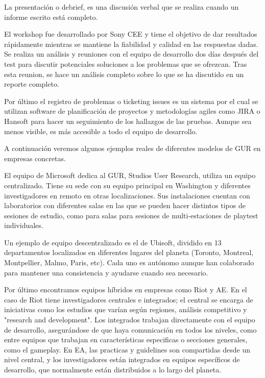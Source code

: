 La presentación o debrief, es una discusión verbal que se realiza cuando un informe escrito está completo.

El workshop fue desarrollado por Sony CEE y tiene el objetivo de dar resultados rápidamente mientras se mantiene la fiabilidad y calidad en las respuestas dadas. Se realiza un análisis y reuniones con el equipo de desarrollo dos días después del test para discutir potenciales soluciones a los problemas que se ofrezcan. Tras esta reunion, se hace un análisis completo sobre lo que se ha discutido en un reporte completo.

Por último el registro de problemas o ticketing issues es un sistema por el cual se utilizan software de planificación de proyectos y metodologías agiles como JIRA o Hansoft para hacer un seguimiento de los hallazgos de las pruebas. Aunque sea menos visible, es más accesible a todo el equipo de desarrollo.




A continuación veremos algunos ejemplos reales de diferentes modelos de GUR en empresas concretas.

El equipo de Microsoft dedica al GUR, Studios User Research, utiliza un equipo centralizado. Tiene su sede con su equipo principal en Washington y diferentes investigadores en remoto en otras localizaciones. Sus instalaciones cuentan con laboratorios con diferentes salas en las que se pueden hacer distintos tipos de sesiones de estudio, como para salas para sesiones de multi-estaciones de playtest individuales.

Un ejemplo de equipo descentralizado es el de Ubisoft, dividido en 13 departamentos localizados en diferentes lugares del planeta (Toronto, Montreal, Montpellier, Malmo, Paris, etc). Cada uno es autónomo aunque han colaborado para mantener una consistencia y ayudarse cuando sea necesario.

Por último encontramos equipos híbridos en empresas como Riot y AE. En el caso de Riot tiene investigadores centrales e integrados; el central se encarga de iniciativas como los estudios que varían según regiones, análisis competitivo y "research and development". Los integrados trabajan directamente con el equipo de desarrollo, asegurándose de que haya comunicación en todos los niveles, como entre equipos que trabajan en características especificas o secciones generales, como el gameplay. En EA, las practicas y guidelines son compartidas desde un nivel central, y los investigadores están integrados en equipos específicos de desarrollo, que normalmente están distribuidos a lo largo del planeta.

